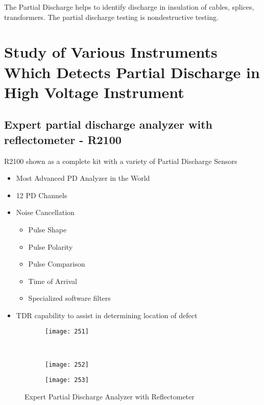 The Partial Discharge helps to identify discharge in insulation of cables, splices, transformers. The partial discharge testing is nondestructive testing\setlength{\parskip}{0em}.

\section{Study of Various Instruments Which Detects Partial Discharge in  High Voltage Instrument}

\subsection{Expert partial discharge analyzer with reflectometer - R2100}
R2100 shown as a complete kit with a variety of Partial Discharge Sensors
\begin{itemize}
\item Most Advanced PD Analyzer in the World
\item 12 PD Channels 
\item Noise Cancellation 
\begin{itemize}
\item Pulse Shape 
\item Pulse Polarity 
\item Pulse Comparison 
\item Time of Arrival 
\item Specialized software filters
\end{itemize}
\item TDR capability to assist in determining location of defect 
\end{itemize}

\begin{figure}[h!]
    \centering
    \begin{subfigure}[b]{0.32\textwidth}
        \centering
        \texttt{[image: 251]}
    \end{subfigure}
    \\
    \begin{subfigure}[b]{0.32\textwidth}
        \centering
        \texttt{[image: 252]}
    \end{subfigure}
    \hspace{1cm}
    \begin{subfigure}[b]{0.32\textwidth}
        \centering
        \texttt{[image: 253]}
    \end{subfigure}
    
    \caption{Expert Partial Discharge Analyzer with Reflectometer }
    \label{fig:Expert Partial Discharge Analyzer with Reflectometer }
\end{figure}

